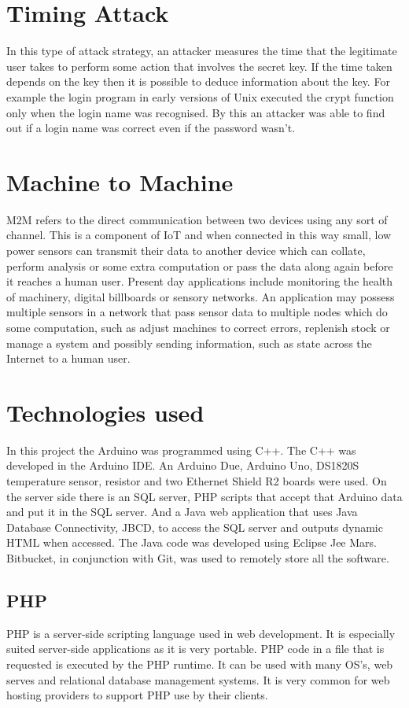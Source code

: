 \section{Timing Attack}
In this type of attack strategy, an attacker measures the time that the legitimate user takes to perform some action that involves the secret key. If the time taken depends on the key then it is possible to deduce information about the key. For example the login program in early versions of Unix executed the crypt function only when the login name was recognised. By this an attacker was able to find out if a login name was correct even if the password wasn't.

\section{Machine to Machine}

M2M refers to the direct communication between two devices using any sort of channel. This is a component of IoT and when connected in this way small, low power sensors can transmit their data to another device which can collate, perform analysis or some extra computation or pass the data along again before it reaches a human user. Present day applications include monitoring the health of machinery, digital billboards or sensory networks. An application may possess multiple sensors in a network that pass sensor data to multiple nodes which do some computation, such as adjust machines to correct errors, replenish stock or manage a system and possibly sending information, such as state across the Internet to a human user.

\section{Technologies used}

In this project the Arduino was programmed using C++. The C++ was developed in the Arduino IDE. An Arduino Due, Arduino Uno, DS1820S temperature sensor, resistor and two Ethernet Shield R2 boards were used. On the server side there is an SQL server, PHP scripts that accept that Arduino data and put it in the SQL server. And a Java web application that uses Java Database Connectivity, JBCD, to access the SQL server and outputs dynamic HTML when accessed. The Java code was developed using Eclipse Jee Mars. Bitbucket, in conjunction with Git, was used to remotely store all the software.

\subsection{PHP}
PHP is a server-side scripting language used in web development. It is especially suited server-side applications as it is very portable. PHP code in a file that is requested is executed by the PHP runtime. It can be used with many OS's, web serves and relational database management systems. It is very common for web hosting providers to support PHP use by their clients.

